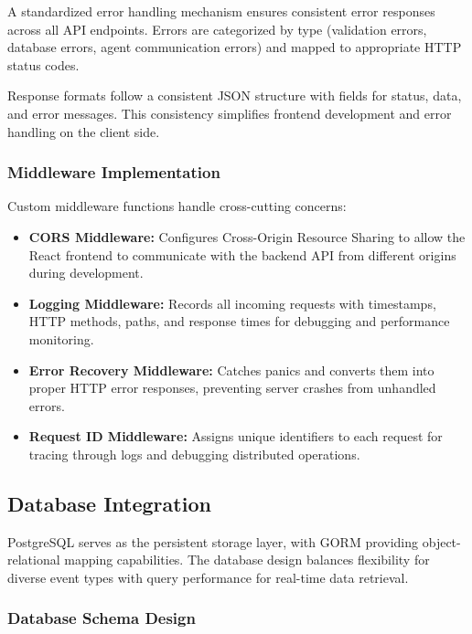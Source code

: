 A standardized error handling mechanism ensures consistent error responses across all API endpoints. Errors are categorized by type (validation errors, database errors, agent communication errors) and mapped to appropriate HTTP status codes.

Response formats follow a consistent JSON structure with fields for status, data, and error messages. This consistency simplifies frontend development and error handling on the client side.

\subsubsection{Middleware Implementation}

Custom middleware functions handle cross-cutting concerns:

\begin{itemize}
    \item \textbf{CORS Middleware:} Configures Cross-Origin Resource Sharing to allow the React frontend to communicate with the backend API from different origins during development.
    
    \item \textbf{Logging Middleware:} Records all incoming requests with timestamps, HTTP methods, paths, and response times for debugging and performance monitoring.
    
    \item \textbf{Error Recovery Middleware:} Catches panics and converts them into proper HTTP error responses, preventing server crashes from unhandled errors.
    
    \item \textbf{Request ID Middleware:} Assigns unique identifiers to each request for tracing through logs and debugging distributed operations.
\end{itemize}

\subsection{Database Integration}

PostgreSQL serves as the persistent storage layer, with GORM providing object-relational mapping capabilities. The database design balances flexibility for diverse event types with query performance for real-time data retrieval.

\subsubsection{Database Schema Design}

